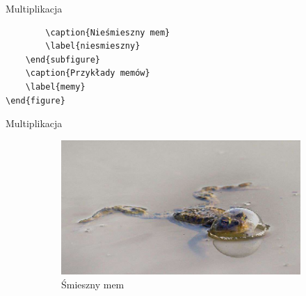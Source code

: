 \documentclass[handout]{beamer}
\begin{document}
\begin{frame}[fragile]{Multiplikacja}{}
\begin{verbatim}
        \caption{Nieśmieszny mem}
        \label{niesmieszny}
    \end{subfigure}
    \caption{Przykłady memów}
    \label{memy}
\end{figure}
    \end{verbatim}
\end{frame}


\begin{frame}[fragile]{Multiplikacja}{}
\begin{figure}
    \centering
    \begin{subfigure}[c]{0.45\textwidth}
        \includegraphics[width=\textwidth]{mem6}
        \caption{Śmieszny mem}
        \label{smieszny}
    \end{subfigure}
    \begin{subfigure}[c]{0.45\textwidth}

\end{subfigure}
\end{figure}
\end{frame}
\end{document}
